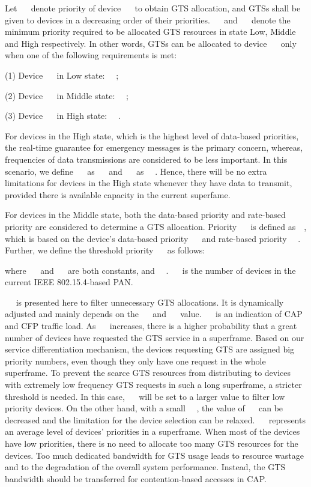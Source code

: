 \documentclass[letterpaper]{sig-alternate-10pt}
\begin{document}
Let ~~ denote priority of device ~~ to obtain GTS allocation, and GTSs shall be given to devices in a decreasing order of their priorities. ~~ and ~~ denote the minimum priority required to be allocated GTS resources in state Low, Middle and High respectively. In other words, GTSs can be allocated to device ~~ only when one of the following requirements is met:

(1)	Device ~~ in Low state: ~~;

(2)	Device ~~ in Middle state: ~~;

(3)	Device ~~ in High state: ~~.

For devices in the High state, which is the highest level of data-based priorities, the real-time guarantee for emergency messages is the primary concern, whereas, frequencies of data transmissions are considered to be less important. In this scenario, we define ~~ as ~~ and ~~ as ~~. Hence, there will be no extra limitations for devices in the High state whenever they have data to transmit, provided there is available capacity in the current superfame.

For devices in the Middle state, both the data-based priority and rate-based priority are considered to determine a GTS allocation. Priority ~~ is defined as~~, which is based on the device's data-based priority ~~  and rate-based priority ~~. Further, we define the threshold priority ~~ as follows:


where ~~ and ~~ are both constants, and ~~. ~~ is the number of devices in the current IEEE 802.15.4-based PAN.

~~ is presented here to filter unnecessary GTS allocations. It is dynamically adjusted and mainly depends on the ~~ and ~~ value. ~~ is an indication of CAP and CFP traffic load. As ~~ increases, there is a higher probability that a great number of devices have requested the GTS service in a superframe. Based on our service differentiation mechanism, the devices requesting GTS are assigned big priority numbers, even though they only have one request in the whole superframe. To prevent the scarce GTS resources from distributing to devices with extremely low frequency GTS requests in such a long superframe, a stricter threshold is needed. In this case, ~~ will be set to a larger value to filter low priority devices. On the other hand, with a small ~~, the value of ~~ can be decreased and the limitation for the device selection can be relaxed. ~~ represents an average level of devices' priorities in a superframe. When most of the devices have low priorities, there is no need to allocate too many GTS resources for the devices. Too much dedicated bandwidth for GTS usage leads to resource wastage and to the degradation of the overall system performance. Instead, the GTS bandwidth should be transferred for contention-based accesses in CAP.
\end{document}
